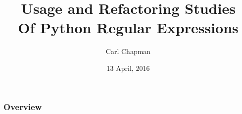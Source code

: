 
\title[Usage and Refactoring of Regex]{Usage and Refactoring Studies \\Of Python Regular Expressions} %

\author{Carl Chapman} %
\date{13 April, 2016} %



\begin{frame}
\titlepage %
\end{frame}

\begin{frame}
\frametitle{Overview} %
\tableofcontents %
\end{frame}
